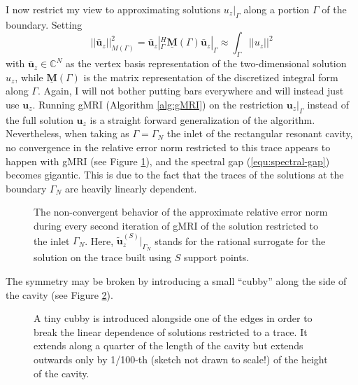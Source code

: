 \documentclass[11pt, a4paper]{article}
\begin{document}
I now restrict my view to approximating solutions $u_z|_{\Gamma}$ along a portion $\Gamma$
of the boundary. Setting
\begin{equation}
    ||\mathbf{\bar{u}}_z||_{M(\Gamma)}^2 = \mathbf{\bar{u}}_z|_{\Gamma}^H \mathbf{\underline{M}}(\Gamma) \mathbf{\bar{u}}_z|_{\Gamma}
        \approx \int_{\Gamma} ||u_z||^2
\end{equation}
with $\mathbf{\bar{u}}_z \in \mathbb{C}^N$ as the vertex basis representation of
the two-dimensional solution $u_z$, while $\mathbf{\underline{M}}(\Gamma)$ is the
matrix representation of the discretized integral form along $\Gamma$.
Again, I will not bother putting bars everywhere and will instead just use $\mathbf{u}_z$.
Running \acrshort{gMRI} (Algorithm \ref{alg:gMRI}) on the restriction $\mathbf{u}_z|_{\Gamma}$
instead of the full solution $\mathbf{u}_z$ is a straight forward generalization of the
algorithm. Nevertheless, when taking as $\Gamma = \Gamma_N$ the inlet of the
rectangular resonant cavity, no convergence in the relative error norm restricted
to this trace appears to happen with \acrshort{gMRI} (see Figure \ref{fig:rectangular-cavity-trace-errornorm}),
and the spectral gap (\ref{equ:spectral-gap}) becomes gigantic.
This is due to the fact that the traces of the solutions at the boundary $\Gamma_N$
are heavily linearly dependent.

\begin{figure}[ht]
    \centering
    
    \caption{The non-convergent behavior of the approximate relative error norm
    during every second iteration of \acrshort{gMRI} of the solution
    restricted to the inlet $\Gamma_N$. Here, $\mathbf{\tilde{u}}_z^{(S)}|_{\Gamma_N}$ stands 
    for the rational surrogate for the solution on the trace built using $S$
    support points.}
    \label{fig:rectangular-cavity-trace-errornorm}
\end{figure}

The symmetry may be broken by introducing a small \enquote{cubby} along the side
of the cavity (see Figure \ref{fig:rectangular-cavity-cubby}). 

\begin{figure}[h]
    \centering
    
    \caption{A tiny cubby is introduced alongside one of the edges in order to
    break the linear dependence of solutions restricted to a trace. It extends
    along a quarter of the length of the cavity but extends outwards only by
    1/100-th (sketch not drawn to scale!) of the height of the cavity.}
    \label{fig:rectangular-cavity-cubby}
\end{figure}
\end{document}
